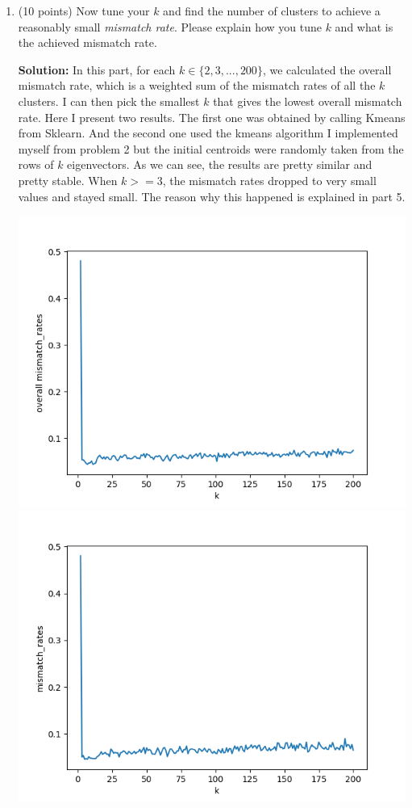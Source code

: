 \documentclass[twoside,10pt]{article}
\begin{document}
\begin{enumerate}
\item (10 points) Now tune your $k$ and find the number of clusters to achieve a reasonably small {\it mismatch rate}. Please explain how you tune $k$ and what is the achieved mismatch rate.  
\begin{tcolorbox}
\textbf{Solution:} In this part, for each $k \in \{2,3,...,200\}$, we calculated the overall mismatch rate, which is a weighted sum of the mismatch rates of all the $k$ clusters. I can then pick the smallest $k$ that gives the lowest overall mismatch rate. Here I present two results. The first one was obtained by calling Kmeans from Sklearn. And the second one used the kmeans algorithm I implemented myself from problem 2 but the initial centroids were randomly taken from the rows of $k$ eigenvectors. As we can see, the results are pretty similar and pretty stable. When $k>=3$, the mismatch rates dropped to very small values and stayed small. The reason why this happened is explained in part 5.
\begin{center}
    \includegraphics[scale = .4]{images/spectral1.png}
    \includegraphics[scale = .4]{images/spectral2.png}
\end{center}


\end{tcolorbox}
\end{enumerate}
\end{document}

